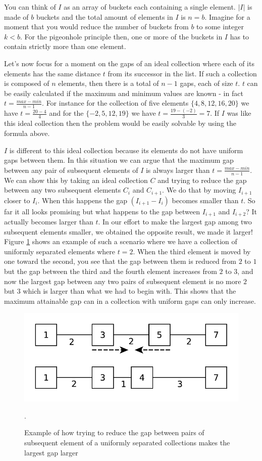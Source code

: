 You can think of $I$ as an array of buckets each containing a single element. $|I|$ is made of $b$
buckets and the total amount of elements in $I$ is $n=b$. Imagine for a moment that you would reduce
the number of buckets from $b$ to some integer $k < b$. For the pigeonhole principle then, one or
more of the buckets in $I$ has to contain strictly more than one element.

Let's now focus for a moment on the gaps of an ideal collection where each of its elements has 
the same distance $t$ from its successor in the list. If such a collection is composed of  $n$
elements, then there is a total of $n-1$ gaps, each of size $t$. $t$ can be easily calculated if the
maximum and minimum values are known - in fact $t=\frac{max-min}{n-1}$. For instance for the
collection of five elements $\{4,8,12,16,20\}$ we have $t=\frac{20-4}{4}$ and for the
$\{-2,5,12,19\}$ we have $t=\frac{19- (-2)}{3} = 7$. If $I$ was like this ideal collection then the
problem would be easily solvable by using the formula above. 

$I$ is different to this ideal collection because its elements do not have uniform gaps between them. In this situation  we can argue that the maximum gap between any pair of subsequent
elements of $I$ is always larger than $t=\frac{max-min}{n-1}$. We can show this by taking an ideal
collection $C$ and trying to reduce the gap between any two subsequent elements $C_{i}$ and $C_{i+1}$.
We  do that by moving $I_{i+1}$ closer to $I_{i}$. When this happens the gap $(I_{i+1}-I_{i})$
becomes smaller than $t$. So far it all looks promising but what happens to the gap between
$I_{i+1}$ and $I_{i+2}$? It actually becomes larger than $t$. In our effort to make the largest gap
among two subsequent elements smaller, we obtained the opposite result, we made it larger! Figure
\ref{fig:max_gap:move_t} shows an example of such a scenario where we have a collection of uniformly
separated elements where $t  = 2$. When the third element is moved by one toward the second, you see
that the gap between them is reduced from $2$ to $1$ but the gap between the third and the fourth
element increases from $2$ to $3$, and now the largest gap between any two pairs of subsequent
element is no more $2$ but $3$ which is larger than what we had to begin with. This shows that the
maximum attainable gap can in a  collection with uniform gaps can only increase. 
\begin{figure}
	\centering
	\includegraphics[width=\textwidth]{sources/max_gap/images/move_t}
	\caption{Example of how trying to reduce the gap between pairs of subsequent element of a
	uniformly separated collections makes the largest gap larger}.
   \label{fig:max_gap:move_t}
\end{figure}


